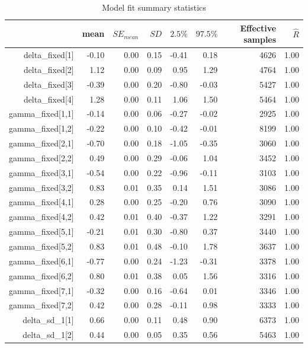 \documentclass[oneside,a4paper]{article}
\begin{document}
\begin{table}[H]
\caption{Model fit summary statistics}
\label{tab:fitsum}
\begin{tabular}{rrrrrrrr}
  \hline
  & mean & $SE_{mean}$ & $SD$ & $2.5\%$ & $97.5\%$ & Effective samples & $\hat{R}$ \\ 
  \hline
  delta\_fixed[1] & -0.10 & 0.00 & 0.15 & -0.41 & 0.18 & 4626 & 1.00 \\ 
  delta\_fixed[2] & 1.12 & 0.00 & 0.09 & 0.95 & 1.29 & 4764 & 1.00 \\ 
  delta\_fixed[3] & -0.39 & 0.00 & 0.20 & -0.80 & -0.03 & 5427 & 1.00 \\ 
  delta\_fixed[4] & 1.28 & 0.00 & 0.11 & 1.06 & 1.50 & 5464 & 1.00 \\ 
  gamma\_fixed[1,1] & -0.14 & 0.00 & 0.06 & -0.27 & -0.02 & 2925 & 1.00 \\ 
  gamma\_fixed[1,2] & -0.22 & 0.00 & 0.10 & -0.42 & -0.01 & 8199 & 1.00 \\ 
  gamma\_fixed[2,1] & -0.70 & 0.00 & 0.18 & -1.05 & -0.35 & 3060 & 1.00 \\ 
  gamma\_fixed[2,2] & 0.49 & 0.00 & 0.29 & -0.06 & 1.04 & 3452 & 1.00 \\ 
  gamma\_fixed[3,1] & -0.54 & 0.00 & 0.22 & -0.96 & -0.11 & 3103 & 1.00 \\ 
  gamma\_fixed[3,2] & 0.83 & 0.01 & 0.35 & 0.14 & 1.51 & 3086 & 1.00 \\ 
  gamma\_fixed[4,1] & 0.28 & 0.00 & 0.25 & -0.20 & 0.76 & 3090 & 1.00 \\ 
  gamma\_fixed[4,2] & 0.42 & 0.01 & 0.40 & -0.37 & 1.22 & 3291 & 1.00 \\ 
  gamma\_fixed[5,1] & -0.21 & 0.01 & 0.30 & -0.80 & 0.37 & 3440 & 1.00 \\ 
  gamma\_fixed[5,2] & 0.83 & 0.01 & 0.48 & -0.10 & 1.78 & 3637 & 1.00 \\ 
  gamma\_fixed[6,1] & -0.77 & 0.00 & 0.24 & -1.23 & -0.31 & 3378 & 1.00 \\ 
  gamma\_fixed[6,2] & 0.80 & 0.01 & 0.38 & 0.05 & 1.56 & 3316 & 1.00 \\ 
  gamma\_fixed[7,1] & -0.32 & 0.00 & 0.16 & -0.64 & 0.01 & 3346 & 1.00 \\ 
  gamma\_fixed[7,2] & 0.42 & 0.00 & 0.28 & -0.11 & 0.98 & 3333 & 1.00 \\ 
  delta\_sd\_1[1] & 0.66 & 0.00 & 0.11 & 0.48 & 0.90 & 6373 & 1.00 \\ 
  delta\_sd\_1[2] & 0.44 & 0.00 & 0.05 & 0.35 & 0.56 & 5463 & 1.00 \\ 

\end{tabular}
\end{table}
\end{document}
